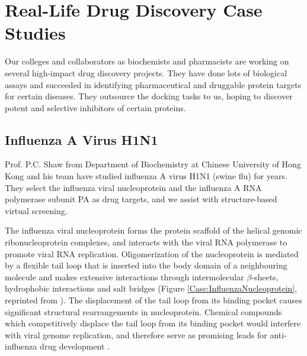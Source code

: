\chapter{Real-Life Drug Discovery Case Studies}

Our colleges and collaborators as biochemists and pharmacists are working on several high-impact drug discovery projects. They have done lots of biological assays and succeeded in identifying pharmaceutical and druggable protein targets for certain diseases. They outsource the docking tasks to us, hoping to discover potent and selective inhibitors of certain proteins.

\section{Influenza A Virus H1N1}

Prof. P.C. Shaw from Department of Biochemistry at Chinese University of Hong Kong and his team have studied influenza A virus H1N1 (swine flu) for years. They select the influenza viral nucleoprotein and the influenza A RNA polymerase subunit PA as drug targets, and we assist with structure-based virtual screening.

The influenza viral nucleoprotein forms the protein scaffold of the helical genomic ribonucleoprotein complexes, and interacts with the viral RNA polymerase to promote viral RNA replication. Oligomerization of the nucleoprotein is mediated by a flexible tail loop that is inserted into the body domain of a neighbouring molecule and makes extensive interactions through intermolecular $\beta$-sheets, hydrophobic interactions and salt bridges (Figure \ref{Case:InfluenzaNucleoprotein}, reprinted from \citep{1140}). The displacement of the tail loop from its binding pocket causes significant structural rearrangements in nucleoprotein. Chemical compounds which competitively displace the tail loop from its binding pocket would interfere with viral genome replication, and therefore serve as promising leads for anti-influenza drug development \citep{1140}.

